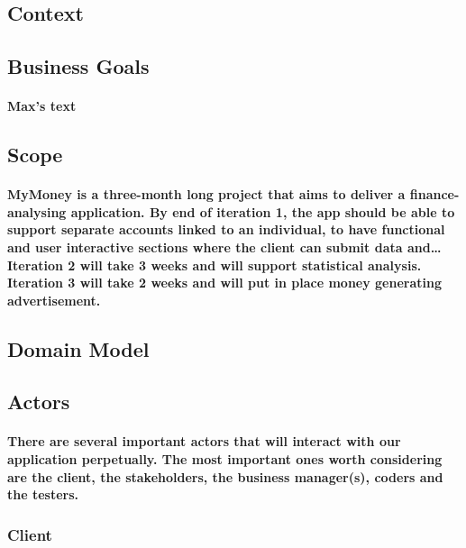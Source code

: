 \documentclass{article}
\begin{document}
\subsection{Context}
\paragraph{\indent }

\subsection{Business Goals}
\paragraph{\indent Max's text}

\subsection{Scope}
\paragraph{\indent MyMoney is a three-month long project that aims to deliver a finance-analysing application.  By end of iteration 1, the app should be able to support separate accounts linked to an individual, to have functional and user interactive sections where the client can submit data and… Iteration 2 will take 3 weeks and will support statistical analysis. Iteration 3 will take 2 weeks and will put in place money generating advertisement. }

\subsection{Domain Model}

\subsection{Actors}
\paragraph{\indent There are several important actors that will interact with our application perpetually. The most important ones worth considering are the client, the stakeholders, the business manager(s), coders and the testers.}

\subsubsection{Client}
\end{document}
